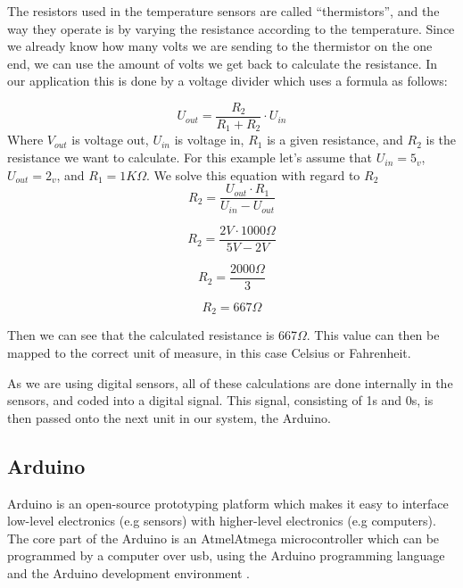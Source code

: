 The resistors used in the temperature sensors are called “thermistors”, and the way they operate is by varying the resistance according to the temperature. Since we already know how many volts we are sending to the thermistor on the one end, we can use the amount of volts we get back to calculate the resistance. In our application this is done by a voltage divider which uses a formula as follows: 

\begin{equation}
U_{out}=\frac{R_{2}}{R_{1}+R_{2}}\cdot U_{in} 
\label{eq:vdiv1}
\end{equation}
Where $V_{out}$ is voltage out, $U_{in}$ is voltage in, $R_{1}$ is a given resistance, and $R_{2}$ is the resistance we want to calculate. For this example let's assume that $U_{in} = 5_{v}$, $U_{out} = 2_{v}$, and $R_{1} = 1K\Omega$. We solve this equation with regard to $R_{2}$
\begin{equation}
R_{2} = \frac{U_{out} \cdot R_{1}}{U_{in}-U_{out}}
\end{equation} 

\begin{equation}
R_{2} = \frac{2V \cdot 1000\Omega}{5V-2V}
\end{equation} 

\begin{equation}
R_{2} = \frac{2000\Omega}{3}
\end{equation} 

\begin{equation}
R_{2} = 667\Omega
\end{equation} 

Then we can see that the calculated resistance is 667$\Omega$. This value can then be mapped to the correct unit of measure, in this case Celsius or Fahrenheit. 

As we are using digital sensors, all of these calculations are done internally in the sensors, and coded into a digital signal. This signal, consisting of 1s and 0s, is then passed onto the next unit in our system, the Arduino.  

\subsection{Arduino}

Arduino is an open-source prototyping platform which makes it easy to interface low-level electronics (e.g sensors) with higher-level electronics (e.g computers). The core part of the Arduino is an Atmel\texttrademark Atmega microcontroller which can be programmed by a computer over usb, using the Arduino programming language and the Arduino development environment \citep{arduino}.

